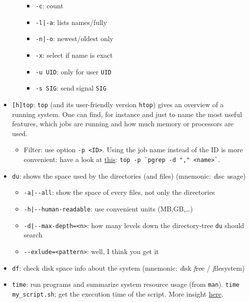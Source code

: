 \documentclass[a4paper,12pt,%
              final%
              ]{article}
\begin{document}
\begin{itemize}
\begin{itemize}
        \begin{itemize}
          \item \verb|-c|: count
          \item \verb!-l|-a!: lists names/fully
          \item \verb!-n|-o!: newest/oldest only
          \item \verb|-x|: select if name is exact
          \item \verb|-u UID|: only for user \verb|UID|
          \item \verb|-s SIG|: send signal \verb|SIG|
        \end{itemize}
    \end{itemize}
  \item \verb|[h]top|: \verb|top| (and its user-friendly version \verb|htop|) gives an overview of a running system. One can find, for instance and just to name the most useful features, which jobs are running and how much memory or processors are used.
    \begin{itemize}
      \item Filter: use option \verb|-p <ID>|. Using the job name instead of the ID is more convenient: have a look at \href{https://unix.stackexchange.com/a/347544}{this}: \verb|top -p `pgrep -d "," <name>`|.
    \end{itemize}
  \item \texttt{du}: shows the space used by the directories (and files) (mnemonic: \emph{d}isc \emph{u}sage)
    \begin{itemize}
      \item \verb!-a|--all!: show the space of every files, not only the directories
      \item \verb!-h|--human-readable!: use convenient units (MB,GB,\ldots)
      \item \verb!-d|--max-depth=<n>!: how many levels down the directory-tree \texttt{du} should search
      \item \verb|--exlude=<pattern>|: well, I think you get it
    \end{itemize}
  \item \texttt{df}: check disk space info about the system (mnemonic: \emph{d}isk \emph{f}ree / \emph{f}ilesystem)
  \item \texttt{time}: run programs and summarize system resource usage (from \texttt{man}). \verb|time my_script.sh|; get the execution time of the script. More insight \href{https://stackoverflow.com/questions/556405/what-do-real-user-and-sys-mean-in-the-output-of-time1/556411#556411}{here}.

\end{itemize}
\end{document}
